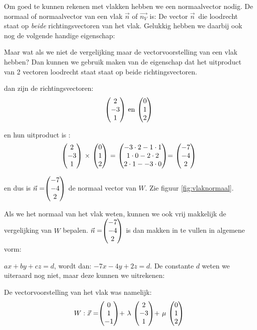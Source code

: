 Om goed te kunnen rekenen met vlakken hebben we een normaalvector nodig.
\label{vlaknormaal}
{De normaal of normaalvector van een vlak $\vec{n}$ of  $\overrightarrow{n_{V}}$ is: De vector $ \vec{n} $\ die loodrecht staat op \textit{beide} richtingsvectoren van het vlak. Gelukkig hebben we daarbij ook nog de volgende handige eigenschap:}



Maar wat als we niet de vergelijking maar de vectorvoorstelling van een vlak hebben? Dan kunnen we gebruik maken van de eigenschap dat  het uitproduct van 2 vectoren loodrecht staat staat op beide richtingsvectoren. 

dan zijn de richtingsvectoren: \[\vecdrie{2}{-3}{1} \text{ en } \vecdrie{0}{1}{2} \]
 
en hun uitproduct is : \[
 \vecdrie{2}{-3}{1} \ \times \  \vecdrie{0}{1}{2}  \ = \ \vecdrie{-3\cdot2-1\cdot1}{1\cdot0-2\cdot2}{2\cdot1--3\cdot0} = \ \vecdrie{-7}{-4}{2} 
\]
 
en dus is $ \vec{n} = \vecdrie{-7}{-4}{2}  $ de normaal vector van $ W $.  Zie figuur  \ref{fig:vlaknormaal}.


Als we het normaal van het vlak weten, kunnen we ook vrij makkelijk de vergelijking van $ W $ bepalen. $\vec{n} = \vecdrie{-7}{-4}{2} $ is dan makken in te vullen in algemene vorm: 

$ax + by + cz = d$, wordt dan: $ -7x-4y+2z = d $. De constante $d$ weten we uiteraard nog niet, maar deze kunnen we uitrekenen: 

De vectorvoorstelling van het vlak was namelijk: 
\[
    W: \vec{x} = \vecdrie{0}{1}{-1} +\ \lambda\ \vecdrie{2}{-3}{1} +\ \mu\ \vecdrie{0}{1}{2} 
\]

